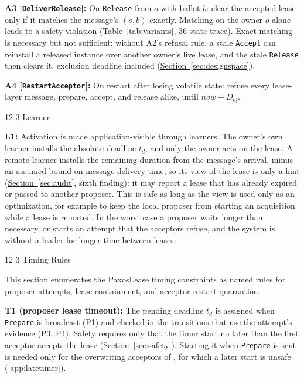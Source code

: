 \documentclass[final,5p,times,twocolumn,number]{elsarticle}
\makeatletter
\newcommand{\code}[1]{\texttt{#1}}
\newcommand{\invitem}[1]{\smallskip\noindent\textbf{#1:} }
\newcommand{\secref}[1]{\hyperref[#1]{Section~\ref*{#1}}}
\newcommand{\tabref}[1]{\hyperref[#1]{Table~\ref*{#1}}}
\renewcommand\subsection{\@startsection{subsection}{2}{\z@}%
           {12\p@ \@plus 6\p@ \@minus 3\p@}%
           {3\p@ \@plus 6\p@ \@minus 3\p@}%
           {\normalfont\normalsize\bfseries}}
\makeatother
\begin{document}
\invitem{A3 [\code{DeliverRelease}]}On \code{Release} from $o$ with ballot $b$: clear the accepted lease only if it matches the message's $(o, b)$ exactly.  Matching on the owner $o$ alone leads to a safety violation (\tabref{tab:variants}, 36-state trace).  Exact matching is necessary but not sufficient: without A2's refusal rule, a stale \code{Accept} can reinstall a released instance over another owner's live lease, and the stale \code{Release} then clears it, exclusion deadline included (\secref{sec:designspace}).

\invitem{A4 [\code{RestartAcceptor}]}On restart after losing volatile state: refuse every lease-layer message, prepare, accept, and release alike, until $now + D_Q$.

\subsection{Learner}

\invitem{L1}Activation is made application-visible through learners.  The owner's own learner installs the absolute deadline $t_d$, and only the owner acts on the lease.  A remote learner installs the remaining duration from the message's arrival, minus an assumed bound on message delivery time, so its view of the lease is only a hint (\secref{sec:audit}, sixth finding): it may report a lease that has already expired or passed to another proposer.  This is safe as long as the view is used only as an optimization, for example to keep the local proposer from starting an acquisition while a lease is reported.  In the worst case a proposer waits longer than necessary, or starts an attempt that the acceptors refuse, and the system is without a leader for longer time between leases.

\subsection{Timing Rules}

This section enumerates the PaxosLease timing constraints as named rules for proposer attempts, lease containment, and acceptor restart quarantine.

\invitem{T1 (proposer lease timeout)}The pending deadline $t_d$ is assigned when \code{Prepare} is broadcast (P1) and checked in the transitions that use the attempt's evidence (P3, P4).  Safety requires only that the timer start no later than the first acceptor accepts the lease (\secref{sec:safety}).  Starting it when \code{Prepare} is sent is needed only for the overwriting acceptors of \cite{ref1}, for which a later start is unsafe (\ref{app:latetimer}).
\end{document}
